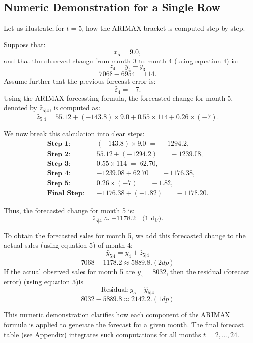 \documentclass[10pt]{article}
\begin{document}
\subsection{Numeric Demonstration for a Single Row}
Let us illustrate, for \(t=5\), how the ARIMAX bracket is computed step by step.

Suppose that:
\[
x_5 = 9.0,
\]
and that the observed change from month 3 to month 4 (using equation 4) is:
\[
z_4 = y_4 - y_3 \] \[ 7068-6954= 114.
\]
Assume further that the previous forecast error is:
\[
\hat{\varepsilon}_4 = -7.
\]
Using the ARIMAX forecasting formula, the forecasted change for month 5, denoted by \(\hat{z}_{5|4}\), is computed as:
\[
\hat{z}_{5|4} = 55.12 + (-143.8)\times 9.0 + 0.55\times 114 + 0.26\times (-7).
\]

We now break this calculation into clear steps:
\begin{align*}
\textbf{Step 1:} \quad & (-143.8) \times 9.0 \;=\; -1294.2, \\
\textbf{Step 2:} \quad & 55.12 + (-1294.2) \;=\; -1239.08, \\
\textbf{Step 3:} \quad & 0.55 \times 114 \;=\; 62.70, \\
\textbf{Step 4:} \quad & -1239.08 + 62.70 \;=\; -1176.38, \\
\textbf{Step 5:} \quad & 0.26 \times (-7) \;=\; -1.82, \\
\textbf{Final Step:} \quad & -1176.38 + (-1.82) \;=\; -1178.20.
\end{align*}

Thus, the forecasted change for month 5 is:
\[
\hat{z}_{5|4} \approx -1178.2 \quad \text{(1 dp)}.
\]

To obtain the forecasted sales for month 5, we add this forecasted change to the actual sales (using equation 5) of month 4:
\[
\hat{y}_{5|4} = y_4 + \hat{z}_{5|4}\] \[ 7068 - 1178.2 \approx 5889.8. (2dp)
\]
If the actual observed sales for month 5 are \(y_5 = 8032\), then the residual (forecast error) (using equation 3)is:
\[
\text{Residual} :y_5 - \hat{y}_{5|4} \]
\[ 8032 - 5889.8 \approx 2142.2. (1 dp)
\]

This numeric demonstration clarifies how each component of the ARIMAX formula is applied to generate the forecast for a given month. The final forecast table (see Appendix) integrates such computations for all months \(t=2,\dots,24\).
\end{document}
